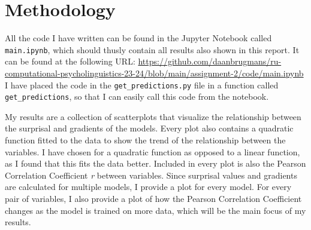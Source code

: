 \documentclass{IEEEtran}
\begin{document}
\section{Methodology}
All the code I have written can be found in the Jupyter Notebook called \texttt{main.ipynb}, which should thusly contain all results also shown in this report.
It can be found at the following URL: \url{https://github.com/daanbrugmans/ru-computational-psycholinguistics-23-24/blob/main/assignment-2/code/main.ipynb}
I have placed the code in the \texttt{get\_predictions.py} file in a function called \texttt{get\_predictions}, so that I can easily call this code from the notebook.



My results are a collection of scatterplots that visualize the relationship between the surprisal and gradients of the models.
Every plot also contains a quadratic function fitted to the data to show the trend of the relationship between the variables.
I have chosen for a quadratic function as opposed to a linear function, as I found that this fits the data better.
Included in every plot is also the Pearson Correlation Coefficient \textit{r} between variables.
Since surprisal values and gradients are calculated for multiple models, I provide a plot for every model.
For every pair of variables, I also provide a plot of how the Pearson Correlation Coefficient changes as the model is trained on more data, which will be the main focus of my results.
\end{document}
